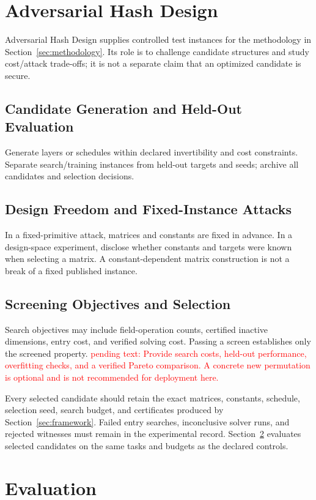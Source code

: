\documentclass[conference]{IEEEtran}
\theoremstyle{definition}
\theoremstyle{plain}
\begin{document}
\section{Adversarial Hash Design}
\label{sec:adversarial}
Adversarial Hash Design supplies controlled test instances for the
methodology in Section~\ref{sec:methodology}. Its role is to challenge
candidate structures and study cost/attack trade-offs; it is not a
separate claim that an optimized candidate is secure.
\subsection{Candidate Generation and Held-Out Evaluation}
Generate layers or schedules within declared invertibility and cost
constraints. Separate search/training instances from held-out targets
and seeds; archive all candidates and selection decisions.
\subsection{Design Freedom and Fixed-Instance Attacks}
In a fixed-primitive attack, matrices and constants are fixed in advance.
In a design-space experiment, disclose whether constants and targets were
known when selecting a matrix. A constant-dependent matrix construction
is not a break of a fixed published instance.
\subsection{Screening Objectives and Selection}
Search objectives may include field-operation counts, certified inactive
dimensions, entry cost, and verified solving cost. Passing a screen
establishes only the screened property.
\textcolor{red}{pending text: Provide search costs, held-out performance,
overfitting checks, and a verified Pareto comparison. A concrete new
permutation is optional and is not recommended for deployment here.}

Every selected candidate should retain the exact matrices, constants,
schedule, selection seed, search budget, and certificates produced by
Section~\ref{sec:framework}. Failed entry searches, inconclusive solver
runs, and rejected witnesses must remain in the experimental record.
Section~\ref{sec:evaluation} evaluates selected candidates on the same
tasks and budgets as the declared controls.


\section{Evaluation}
\label{sec:evaluation}
\end{document}
